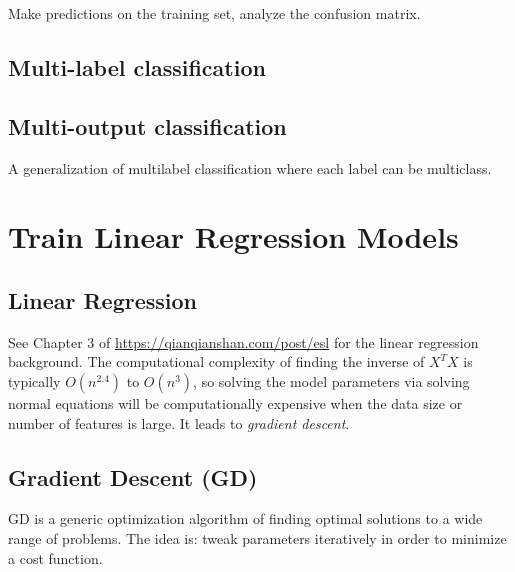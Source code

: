 \documentclass[12pt,oneside,a4paper]{article}
\numberwithin{equation}{section}
\begin{document}
Make predictions on the training set, analyze the confusion matrix. 
\subsection{Multi-label classification}

\subsection{Multi-output classification}
A generalization of multilabel classification where each label can be multiclass. 

\section{Train Linear Regression Models}
\subsection{Linear Regression}
See Chapter 3 of \href{https://qianqianshan.com/post/elementsofstatisticallearning/}{https://qianqianshan.com/post/esl} for the linear regression background. The computational complexity of finding the inverse of $X^TX$ is typically $O(n^{2.4})$ to $O(n^3)$, so solving the model parameters via solving normal equations will be computationally expensive when the data size or number of features is large. It leads to \emph{gradient descent}.
\subsection{Gradient Descent (GD)}
GD is a generic optimization algorithm of finding optimal solutions to a wide range of problems. The idea is: tweak parameters iteratively in order to minimize a cost function.
\end{document}
